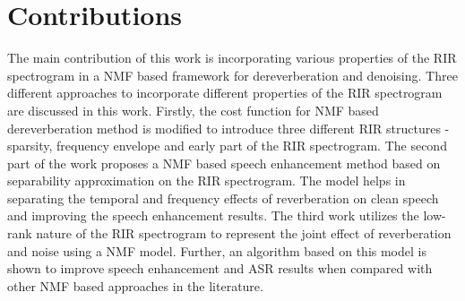 \section{Contributions}
The main contribution of this work is incorporating various properties of the RIR spectrogram in a NMF based framework for dereverberation and denoising. Three different approaches to incorporate different properties of the RIR spectrogram are discussed in this work. Firstly, the cost function for NMF based dereverberation method is modified to introduce three different RIR structures - sparsity, frequency envelope and early part of the RIR spectrogram. The second part of the work proposes a NMF based speech enhancement method based on separability approximation on the RIR spectrogram. The model helps in separating the temporal and frequency effects of reverberation on clean speech and improving the speech enhancement results. The third work utilizes the low-rank nature of the RIR spectrogram to represent the joint effect of reverberation and noise using a NMF model. Further, an algorithm based on this model is shown to improve speech enhancement and ASR results when compared with other NMF based approaches in the literature.

\iffalse
\begin{itemize}
\item incorporate various constraints on RIR spectrogram in a NMF based dereverberation framework
\begin{itemize}
\item model sparsity, frequency envelope, early part of RIR
\item incorporate the constraints in cost function
\end{itemize}
\item A novel NMF based method to handle reverberation and noise jointly
\begin{itemize}
\item propose NMF models for RIR spectrogram (separability assumption, low-rank model)
\item incorporate these models along with NMF models for clean speech and noise spectrograms
\item better constrained model resulting in proper RIR and clean speech estimates
\item improvement in enhancement and ASR results
\item better understanding of effects of reverberation on clean speech bases and activations
\end{itemize}
\end{itemize}
\fi
